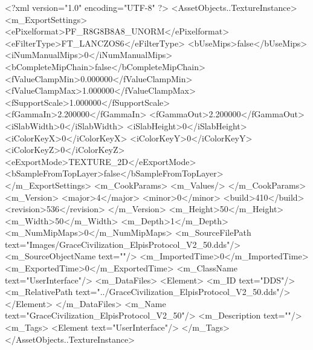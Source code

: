 <?xml version="1.0" encoding="UTF-8" ?>
<AssetObjects..TextureInstance>
	<m_ExportSettings>
		<ePixelformat>PF_R8G8B8A8_UNORM</ePixelformat>
		<eFilterType>FT_LANCZOS6</eFilterType>
		<bUseMips>false</bUseMips>
		<iNumManualMips>0</iNumManualMips>
		<bCompleteMipChain>false</bCompleteMipChain>
		<fValueClampMin>0.000000</fValueClampMin>
		<fValueClampMax>1.000000</fValueClampMax>
		<fSupportScale>1.000000</fSupportScale>
		<fGammaIn>2.200000</fGammaIn>
		<fGammaOut>2.200000</fGammaOut>
		<iSlabWidth>0</iSlabWidth>
		<iSlabHeight>0</iSlabHeight>
		<iColorKeyX>0</iColorKeyX>
		<iColorKeyY>0</iColorKeyY>
		<iColorKeyZ>0</iColorKeyZ>
		<eExportMode>TEXTURE_2D</eExportMode>
		<bSampleFromTopLayer>false</bSampleFromTopLayer>
	</m_ExportSettings>
	<m_CookParams>
		<m_Values/>
	</m_CookParams>
	<m_Version>
		<major>4</major>
		<minor>0</minor>
		<build>410</build>
		<revision>536</revision>
	</m_Version>
	<m_Height>50</m_Height>
	<m_Width>50</m_Width>
	<m_Depth>1</m_Depth>
	<m_NumMipMaps>0</m_NumMipMaps>
	<m_SourceFilePath text="Images/GraceCivilization_ElpisProtocol_V2_50.dds"/>
	<m_SourceObjectName text=""/>
	<m_ImportedTime>0</m_ImportedTime>
	<m_ExportedTime>0</m_ExportedTime>
	<m_ClassName text="UserInterface"/>
	<m_DataFiles>
		<Element>
			<m_ID text="DDS"/>
			<m_RelativePath text="../GraceCivilization_ElpisProtocol_V2_50.dds"/>
		</Element>
	</m_DataFiles>
	<m_Name text="GraceCivilization_ElpisProtocol_V2_50"/>
	<m_Description text=""/>
	<m_Tags>
		<Element text="UserInterface"/>
	</m_Tags>
</AssetObjects..TextureInstance>
